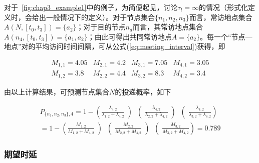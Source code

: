 对于\figurename~\ref{fig:chap3_example1}中的例子，为简便起见，讨论$\tau_l=\infty$的情况（形式化定义时，会给出一般情况下的定义）。对于节点集合$\{n_1,n_2,n_3\}$而言，常访地点集合$A(N,[t_0,t_3])=\{a_2\}$；对于目的节点$n_d$而言，其常访地点集合$A(n_4,[t_0,t_3])=\{a_1,a_2\}$；由此可得出共同常访地点$A=\{a_2\}$。每一个“节点—地点”对的平均访问时间间隔，可从公式(\ref{eq:meeting_interval})获得，即

\[
\begin{array}{llll}
M_{1,1}=4.05 & M_{2,1}=4.2 & M_{3,1}=7.05 & M_{4,1}=3.05 \\
M_{1,2}=3.8 & M_{2,2}=4.4 & M_{3,2}=8.3 & M_{4,2}=3.4
\end{array}
\]

由以上计算结果，可预测节点集合$N$的投递概率，如下

\begin{multline*}
P_{\{n_1,n_2,n_3\},4}=
1-\left(\frac{\lambda_{4,2}}{\lambda_{1,2}+\lambda_{4,2}}\middle)\middle(\frac{\lambda_{4,2}}{\lambda_{2,2}+\lambda_{4,2}}\middle)\middle(\frac{\lambda_{4,2}}{\lambda_{3,2}+\lambda_{4,2}}\right) \\
= 1-\left(\frac{M_{1,2}}{M_{1,2}+M_{4,2}}\middle)\middle(\frac{M_{2,2}}{M_{2,2}+M_{4,2}}\middle)\middle(\frac{M_{3,2}}{M_{3,2}+M_{4,2}}\right) 
= 0.789
\end{multline*}

\subsubsection{期望时延}

